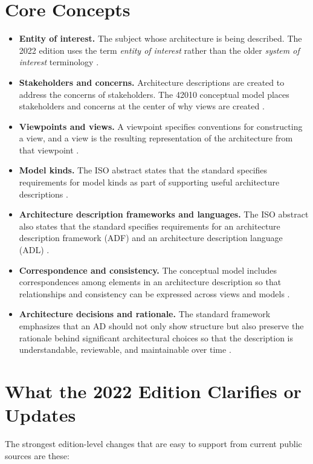 \documentclass[11pt]{article}
\begin{document}
\section*{Core Concepts}
\begin{itemize}
    \item \textbf{Entity of interest.} The subject whose architecture is being described. The 2022 edition uses the term \emph{entity of interest} rather than the older \emph{system of interest} terminology \cite{iso42010,nora42010}.
    \item \textbf{Stakeholders and concerns.} Architecture descriptions are created to address the concerns of stakeholders. The 42010 conceptual model places stakeholders and concerns at the center of why views are created \cite{cm42010}.
    \item \textbf{Viewpoints and views.} A viewpoint specifies conventions for constructing a view, and a view is the resulting representation of the architecture from that viewpoint \cite{cm42010}.
    \item \textbf{Model kinds.} The ISO abstract states that the standard specifies requirements for model kinds as part of supporting useful architecture descriptions \cite{iso42010}.
    \item \textbf{Architecture description frameworks and languages.} The ISO abstract also states that the standard specifies requirements for an architecture description framework (ADF) and an architecture description language (ADL) \cite{iso42010}.
    \item \textbf{Correspondence and consistency.} The conceptual model includes correspondences among elements in an architecture description so that relationships and consistency can be expressed across views and models \cite{cm42010}.
    \item \textbf{Architecture decisions and rationale.} The standard framework emphasizes that an AD should not only show structure but also preserve the rationale behind significant architectural choices so that the description is understandable, reviewable, and maintainable over time \cite{cm42010}.
\end{itemize}

\section*{What the 2022 Edition Clarifies or Updates}
The strongest edition-level changes that are easy to support from current public sources are these:
\end{document}
